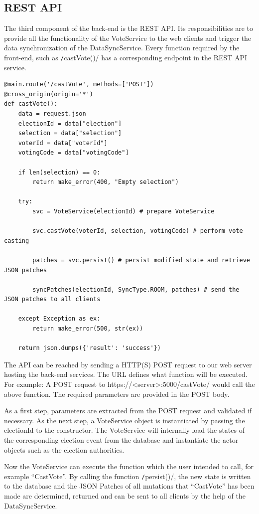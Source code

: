 \subsection{REST API}
The third component of the back-end is the REST API. Its responsibilities are to provide all the functionality of the VoteService to the web clients and trigger the data synchronization of the DataSyncService. Every function required by the front-end, such as \texttt/castVote()/ has a corresponding endpoint in the REST API service.

\begin{verbatim}
@main.route('/castVote', methods=['POST'])
@cross_origin(origin='*')
def castVote():
    data = request.json
    electionId = data["election"]
    selection = data["selection"]
    voterId = data["voterId"]
    votingCode = data["votingCode"]

    if len(selection) == 0:
        return make_error(400, "Empty selection")

    try:
        svc = VoteService(electionId) # prepare VoteService

        svc.castVote(voterId, selection, votingCode) # perform vote casting

        patches = svc.persist()	# persist modified state and retrieve JSON patches

        syncPatches(electionId, SyncType.ROOM, patches)	# send the JSON patches to all clients

    except Exception as ex:
        return make_error(500, str(ex))

    return json.dumps({'result': 'success'})
\end{verbatim}

The API can be reached by sending a HTTP(S) POST request to our web server hosting the back-end services. The URL defines what function will be executed. For example: A POST request to https://<server>:5000/castVote/ would call the above function. The required parameters are provided in the POST body.

As a first step, parameters are extracted from the POST request and validated if necessary. As the next step, a VoteService object is instantiated by passing the electionId to the constructor. The VoteService will internally load the states of the corresponding election event from the database and instantiate the actor objects such as the election authorities.

Now the VoteService can execute the function which the user intended to call, for example "`CastVote"'. By calling the function \texttt/persist()/, the new state is written to the database and the JSON Patches of all mutations that "`CastVote"' has been made are determined, returned and can be sent to all clients by the help of the DataSyncService.

